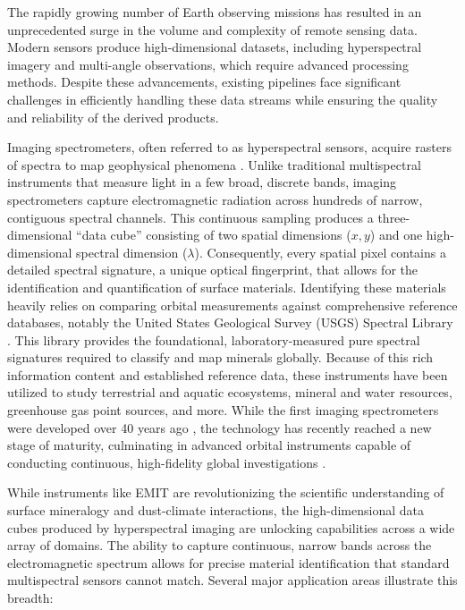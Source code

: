 \documentclass[11pt]{report}
\begin{document}
The rapidly growing number of Earth observing missions has resulted in an unprecedented surge in the volume and complexity of remote sensing data. 
Modern sensors produce high-dimensional datasets, including hyperspectral imagery and multi-angle observations, which require advanced processing methods. 
Despite these advancements, existing pipelines face significant challenges in efficiently handling these data streams while ensuring the quality and reliability of the derived products.

Imaging spectrometers, often referred to as hyperspectral sensors, acquire rasters of spectra to map geophysical phenomena \cite{thompson_emit_2024}. 
Unlike traditional multispectral instruments that measure light in a few broad, discrete bands, imaging spectrometers capture electromagnetic radiation across hundreds of narrow, contiguous spectral channels. 
This continuous sampling produces a three-dimensional ``data cube'' consisting of two spatial dimensions ($x, y$) and one high-dimensional spectral dimension ($\lambda$). 
Consequently, every spatial pixel contains a detailed spectral signature, a unique optical fingerprint, that allows for the identification and quantification of surface materials. 
Identifying these materials heavily relies on comparing orbital measurements against comprehensive reference databases, notably the United States Geological Survey (USGS) Spectral Library \cite{kokaly2017usgs}. 
This library provides the foundational, laboratory-measured pure spectral signatures required to classify and map minerals globally.
Because of this rich information content and established reference data, these instruments have been utilized to study terrestrial and aquatic ecosystems, mineral and water resources, greenhouse gas point sources, and more.
While the first imaging spectrometers were developed over 40 years ago \cite{goetz1985}, the technology has recently reached a new stage of maturity, culminating in advanced orbital instruments capable of conducting continuous, high-fidelity global investigations \cite{thompson_emit_2024}.

While instruments like EMIT are revolutionizing the scientific understanding of surface mineralogy and dust-climate interactions, the high-dimensional data cubes produced by hyperspectral imaging are unlocking capabilities across a wide array of domains. 
The ability to capture continuous, narrow bands across the electromagnetic spectrum allows for precise material identification that standard multispectral sensors cannot match. 
Several major application areas illustrate this breadth:
\end{document}

